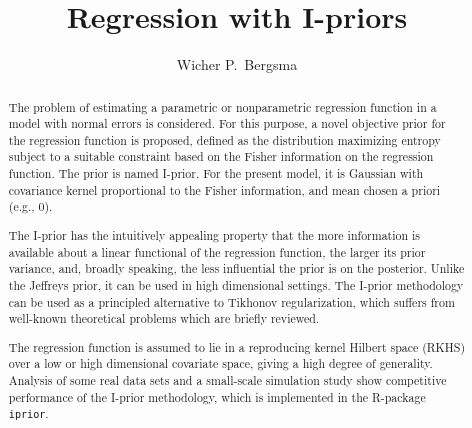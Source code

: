 \documentclass[preprint,12pt,authoryear]{elsarticle}
\begin{document}
	
	\begin{frontmatter}
		
		
		
		\title{Regression with I-priors}
		
		
		\author{Wicher P.\ Bergsma}
		\address{London School of Economics, Houghton Street, London, WC2A 2AE, United Kingdom}
		
		\begin{abstract}
The problem of estimating a parametric or nonparametric regression function in a model with normal errors is considered. 
For this purpose, a novel objective prior for the regression function is proposed, defined as the distribution maximizing entropy subject to a suitable constraint based on the Fisher information on the regression function. The prior is named I-prior. For the present model, it is Gaussian with covariance kernel proportional to the Fisher information, and mean chosen a priori (e.g., 0).

The I-prior has the intuitively appealing property that the more information is available about a linear functional of the regression function, the larger its prior variance, and, broadly speaking, the less influential the prior is on the posterior.
Unlike the Jeffreys prior, it can be used in high dimensional settings. 
The I-prior methodology can be used as a principled alternative to Tikhonov regularization, which suffers from well-known theoretical problems which are briefly reviewed. 

The regression function is assumed to lie in a reproducing kernel Hilbert space (RKHS) over a low or high dimensional covariate space, giving a high degree of generality. 
Analysis of some real data sets and a small-scale simulation study show competitive performance of the I-prior methodology, which is implemented in the R-package \verb|iprior|.
		\end{abstract}


\end{frontmatter}
\end{document}
